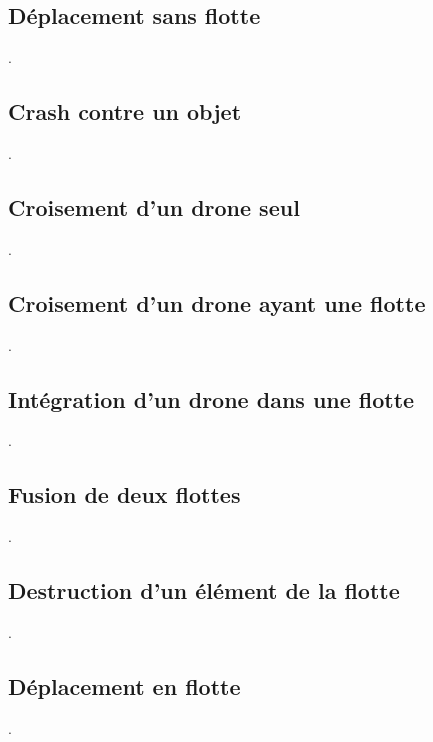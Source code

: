 \documentclass[11pt]{report}
\begin{document}
\subsection{Déplacement sans flotte}
.
\subsection{Crash contre un objet}
.
\subsection{Croisement d'un drone seul}
.
\subsection{Croisement d'un drone ayant une flotte}
.
\subsection{Intégration d'un drone dans une flotte}
.
\subsection{Fusion de deux flottes}
.
\subsection{Destruction d'un élément de la flotte}
.
\subsection{Déplacement en flotte}
.
\end{document}
